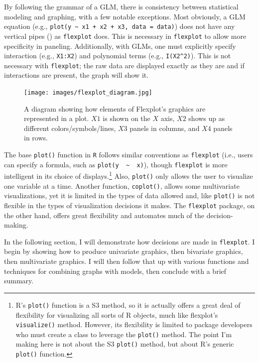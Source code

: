 \documentclass[
  man]{apa6}
\begin{document}
By following the grammar of a GLM, there is consistency between statistical modeling and graphing, with a few notable exceptions. Most obviously, a GLM equation (e.g., \texttt{plot(y\ \textasciitilde{}\ x1\ +\ x2\ +\ x3,\ data\ =\ data)}) does not have any vertical pipes (\texttt{\textbar{}}) as \texttt{flexplot} does. This is necessary in \texttt{flexplot} to allow more specificity in paneling. Additionally, with GLMs, one must explicitly specify interaction (e.g., \texttt{X1:X2}) and polynomial terms (e.g., \texttt{I(X2\^{}2)}). This is not necessary with \texttt{flexplot}; the raw data are displayed exactly as they are and if interactions are present, the graph will show it.

\begin{figure}
\centering
\texttt{[image: images/flexplot\_diagram.jpg]}
\caption{A diagram showing how elements of Flexplot's graphics are represented in a plot. $X1$ is shown on the $X$ axis, $X2$ shows up as different colors/symbols/lines, $X3$ panels in columns, and $X4$ panels in rows.}
\label{fig:flexplotgrammar}
\end{figure}

The base \texttt{plot()} function in \texttt{R} follows similar conventions as \texttt{flexplot} (i.e., users can specify a formula, such as \texttt{plot(y\ \ \textasciitilde{}\ \ x)}), though \texttt{flexplot} is more intelligent in its choice of displays.\footnote{R's \texttt{plot()} function is a S3 method, so it is actually offers a great deal of flexibility for visualizing all sorts of R objects, much like flexplot's \texttt{visualize()} method. However, its flexibility is limited to package developers who must create a class to leverage the \texttt{plot()} method. The point I'm making here is not about the S3 \texttt{plot()} method, but about R's generic \texttt{plot()} function.} Also, \texttt{plot()} only allows the user to visualize one variable at a time. Another function, \texttt{coplot()}, allows some multivariate visualizations, yet it is limited in the types of data allowed and, like \texttt{plot()} is not flexible in the types of visualization decisions it makes. The \texttt{flexplot} package, on the other hand, offers great flexibility and automates much of the decision-making.

In the following section, I will demonstrate how decisions are made in \texttt{flexplot}. I begin by showing how to produce univariate graphics, then bivariate graphics, then multivariate graphics. I will then follow that up with various functions and techniques for combining graphs with models, then conclude with a brief summary.
\end{document}
